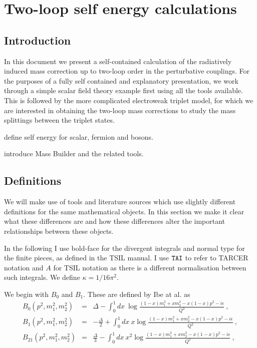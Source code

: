 \documentclass[11pt]{article}
\newcommand{\mb}{\textsf{Mass Builder} \! }
\begin{document}
\section{Two-loop self energy calculations}

\subsection{Introduction}

In this document we present a self-contained calculation of the radiatively induced mass correction up to two-loop order in the perturbative couplings.  For the purposes of a fully self contained and explanatory presentation, we work through a simple scalar field theory example first using all the tools available.  This is followed by the more complicated electroweak triplet model, for which we are interested in obtaining the two-loop mass corrections to study the mass splittings between the triplet states.

define self energy for scalar, fermion and bosons.

introduce \mb and the related tools.


\subsection{Definitions}

We will make use of tools and literature sources which use slightly different definitions for the same mathematical objects.  In this section we make it clear what these differences are and how these differences alter the important relationships between these objects.


In the following I use bold-face for the divergent integrals and normal type for the finite pieces, as defined in the TSIL manual.  I use $\tt{TAI}$ to refer to TARCER notation and $A$ for TSIL notation as there is a different normalisation between such integrals.  We define $\kappa = 1/16\pi^2$.

We begin with $B_0$ and $B_1$.  These are defined by Ibe at al. as
\begin{eqnarray}
B_0(p^2, m_1^2, m_2^2) &=& \Delta
- \int_0^1 dx ~\log \frac{ (1-x)m_1^2 + x m_2^2 - x(1-x)p^2 -i\epsilon }{Q^2}\ , \\
B_1(p^2, m_1^2, m_2^2) &=& -\frac{\Delta}{2}
+ \int_0^1 dx ~x\log \frac{ (1-x)m_1^2 + x m_2^2 - x(1-x)p^2 -i\epsilon }{Q^2}\ , \\
B_{21}(p^2, m_1^2, m_2^2) &=& \frac{\Delta}{3}
- \int_0^1 dx ~x^2\log \frac{ (1-x)m_1^2 + x m_2^2 - x(1-x)p^2 -i\epsilon }{Q^2}\ ,
\end{eqnarray}
\end{document}
